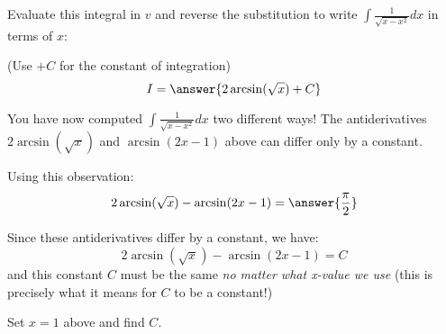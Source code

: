 \documentclass{ximera}
\begin{document}
\begin{exercise}
\begin{exercise}
\begin{exercise}
Evaluate this integral in $v$ and reverse the substitution to write $\int \frac{1}{\sqrt{x-x^2}} dx$ in terms of $x$:

(Use $+C$ for the constant of integration)
\[
I = \answer{2\arcsin(\sqrt{x})+C}
\]

\end{exercise}
\end{exercise}

You have now computed $ \int \frac{1}{\sqrt{x-x^2}} dx$ two different ways!  The antiderivatives $2\arcsin(\sqrt{x})$ and $\arcsin(2x-1)$ above can differ only by a constant.

Using this observation:
\[
2\arcsin(\sqrt{x})-\arcsin(2x-1) = \answer{\frac{\pi}{2}}
\] 

\begin{hint}
Since these antiderivatives differ by a constant, we have:
\[
2\arcsin(\sqrt{x})-\arcsin(2x-1) = C
\]
and this constant $C$ must be the same \emph{no matter what x-value we use} (this is precisely what it means for $C$ to be a constant!)

Set $x=1$ above and find $C$.

\end{hint}

\end{exercise}
\end{document}
